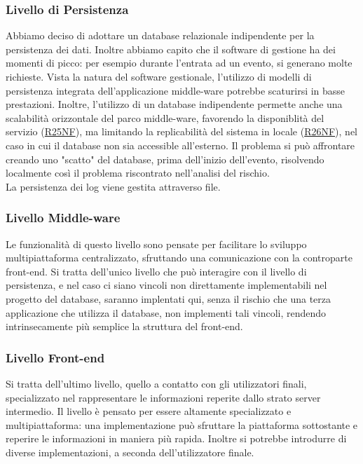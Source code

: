 \documentclass[a4paper]{article}
\begin{document}
\subsubsection{Livello di Persistenza}
Abbiamo deciso di adottare un database relazionale indipendente per la persistenza dei dati. Inoltre abbiamo capito che il software di gestione ha dei momenti di picco: per esempio durante l'entrata ad un evento, si generano molte richieste. Vista la natura del software gestionale, l'utilizzo di modelli di persistenza integrata dell'applicazione middle-ware potrebbe scaturirsi in basse prestazioni. Inoltre, l'utilizzo di un database indipendente permette anche una scalabilità orizzontale del parco middle-ware, favorendo la disponiblità del servizio (\hyperlink{R25NF}{R25NF}), ma limitando la replicabilità del sistema in locale (\hyperlink{R26NF}{R26NF}), nel caso in cui il database non sia accessible all'esterno. Il problema si può affrontare creando uno "scatto" del database, prima dell'inizio dell'evento, risolvendo localmente così il problema riscontrato nell'analisi del rischio.\\La persistenza dei log viene gestita attraverso file.


\subsubsection{Livello Middle-ware}
Le funzionalità di questo livello sono pensate per facilitare lo sviluppo multipiattaforma centralizzato, sfruttando una comunicazione con la controparte front-end. Si tratta dell'unico livello che può interagire con il livello di persistenza, e nel caso ci siano vincoli non direttamente implementabili nel progetto del database, saranno implentati qui, senza il rischio che una terza applicazione che utilizza il database, non implementi tali vincoli, rendendo intrinsecamente più semplice la struttura del front-end.

\subsubsection{Livello Front-end}
Si tratta dell'ultimo livello, quello a contatto con gli utilizzatori finali, specializzato nel rappresentare le informazioni reperite dallo strato server intermedio. Il livello è pensato per essere altamente specializzato e multipiattaforma: una implementazione può sfruttare la piattaforma sottostante e reperire le informazioni in maniera più rapida. Inoltre si potrebbe introdurre di diverse implementazioni, a seconda dell'utilizzatore finale.\\
\end{document}
